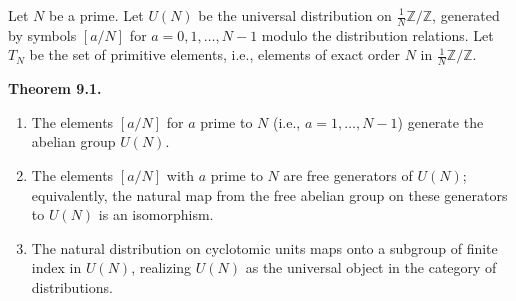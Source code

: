 Let $N$ be a prime. Let $U(N)$ be the universal distribution on $\frac{1}{N}\mathbb{Z}/\mathbb{Z}$, generated by symbols $[a/N]$ for $a = 0, 1, \dots, N-1$ modulo the distribution relations. Let $T_N$ be the set of primitive elements, i.e., elements of exact order $N$ in $\frac{1}{N}\mathbb{Z}/\mathbb{Z}$.

\textbf{Theorem 9.1.}
\begin{enumerate}
  \item[(i)] The elements $[a/N]$ for $a$ prime to $N$ (i.e., $a = 1, \dots, N-1$) generate the abelian group $U(N)$.
  \item[(ii)] The elements $[a/N]$ with $a$ prime to $N$ are free generators of $U(N)$; equivalently, the natural map from the free abelian group on these generators to $U(N)$ is an isomorphism.
  \item[(iii)] The natural distribution on cyclotomic units maps onto a subgroup of finite index in $U(N)$, realizing $U(N)$ as the universal object in the category of distributions.
\end{enumerate}

